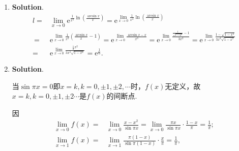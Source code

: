 \documentclass[../Main.tex]{subfiles}
\begin{document}
\begin{enumerate}
          即$k=3,c=\frac{1}{4}$.

          \textbf{法二.}由题意得$\lim_{x\to0}\frac{u}{cx^{k}}=1$. 而
          \[
              \begin{aligned}
                  \lim_{x\to0}\frac{u}{cx^k}= & \frac{\tan x-\sin x}{cx^k(\sqrt{1+\tan x}+\sqrt{1+\sin x})}              \\
                  =                           & \lim_{x\to0}\frac{\tan x(1-\cos x)}{2cx^k}                               \\
                  =                           & \lim_{x\to0}\frac{\frac{1}{2}x^3}{2cx^k}=\lim_{x\to0}\frac{x^{3-k}}{4c},
              \end{aligned}
          \]

          故$3-k=0,4c=1$，即$k=3,c=\frac{1}{4}$.

    \item \textbf{Solution}.
          \[
              \begin{aligned}
                  l= & \lim_{x\to0}\mathrm{e}^{\frac{1}{x^2}\ln\left(\frac{\arcsin x}{x}\right)}=\mathrm{e}^{\lim\limits_{x\to0}\frac{1}{x^2}\ln\left(\frac{\arcsin x}{x}\right)}                                                                                                                            \\
                  \
                  =  & \mathrm{e}^{\lim\limits_{x\to0}\frac{1}{x^2}\left(\frac{\arcsin x}{x}-1\right)}=\mathrm{e}^{\lim\limits_{x\to0}\frac{\arcsin x-x}{x^3}}=\mathrm{e}^{\lim\limits_{x\to0}\frac{\frac{1}{\sqrt{1-x^2}}-1}{3x^2}}=\mathrm{e}^{\lim\limits_{x\to0}\frac{1-\sqrt{1-x^2}}{3x^2\sqrt{1-x^2}}} \\
                  =  & \mathrm{e}^{\lim\limits_{x\to0}\frac{\frac{1}{2}x^2}{3x^2\sqrt{1-x^2}}}=\mathrm{e}^{\frac{1}{6}}.
              \end{aligned}
          \]

    \item \textbf{Solution}.

          当$\sin\pi x=0$即$x=k,k=0,\pm1,\pm2,\cdots$时，$f(x)$无定义，故$x=k,k=0,\pm
              1,\pm2\cdots$是$f(x)$的间断点.

          因
          \[
              \begin{aligned}
                  \lim_{x\to0}f(x)= & \lim_{x\to0}\frac{x-x^2}{\sin\pi x}=\lim_{x\to0}\frac{\pi x}{\sin\pi x}\cdot\frac{1-x}{\pi}=\frac{1}{\pi}; \\
                  \lim_{x\to1}f(x)= & \lim_{x\to1}\frac{\pi(1-x)}{\sin\pi(1-x)}\cdot\frac{x}{\pi}=\frac{1}{\pi},
              \end{aligned}
          \]


\end{enumerate}
\end{document}
